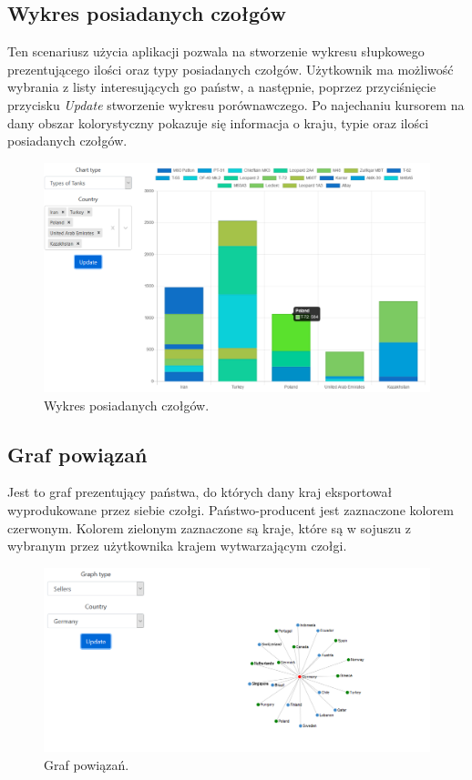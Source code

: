 \subsection{Wykres posiadanych czołgów}
Ten scenariusz użycia aplikacji pozwala na stworzenie wykresu słupkowego prezentującego ilości oraz typy posiadanych czołgów. Użytkownik ma możliwość wybrania z listy interesujących go państw, a następnie, poprzez przyciśnięcie przycisku \textit{Update} stworzenie wykresu porównawczego. Po najechaniu kursorem na dany obszar kolorystyczny pokazuje się informacja o kraju, typie oraz ilości posiadanych czołgów.
\begin{figure}[H]
    \centering \includegraphics[width=0.9\linewidth]{tex/types_of_tanks.PNG}
    \caption{Wykres posiadanych czołgów.}
    \label{fig:types_tanks}
\end{figure}
\subsection{Graf powiązań}
Jest to graf prezentujący państwa, do których dany kraj eksportował wyprodukowane przez siebie czołgi. Państwo-producent jest zaznaczone kolorem czerwonym. Kolorem zielonym zaznaczone są kraje, które są w sojuszu z wybranym przez użytkownika krajem wytwarzającym czołgi.
\begin{figure}[H]
    \centering \includegraphics[width=0.8\linewidth]{tex/sellers.PNG}
    \caption{Graf powiązań.}
    \label{fig:sellers_graph}
\end{figure}
